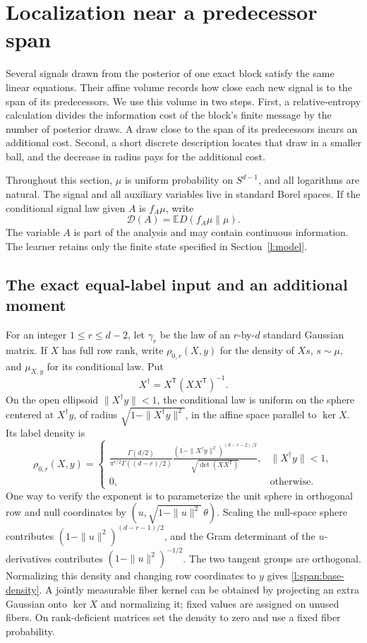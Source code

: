 \section{Localization near a predecessor span}
\label{l:span:section}

Several signals drawn from the posterior of one exact block satisfy
the same linear equations.  Their affine volume records how close
each new signal is to the span of its predecessors.  We use this
volume in two steps.  First, a relative-entropy calculation divides
the information cost of the block's finite message by the number of
posterior draws.  A draw close to the span of its predecessors incurs
an additional cost.  Second, a short discrete description locates
that draw in a smaller ball, and the decrease in radius pays for the
additional cost.

Throughout this section, \(\mu\) is uniform probability on
\(S^{d-1}\), and all logarithms are natural.  The signal and all
auxiliary variables live in standard Borel spaces.  If the conditional
signal law given \(A\) is \(f_A\mu\), write
\[
 \mathcal D(A)=\mathbb E D(f_A\mu\|\mu).
\]
The variable \(A\) is part of the analysis and may contain continuous
information.  The learner retains only the finite state specified in
Section~\ref{l:model}.

\subsection{The exact equal-label input and an additional moment}

For an integer \(1\le r\le d-2\), let \(\gamma_r\) be the law of an
\(r\)-by-\(d\) standard Gaussian matrix.  If \(X\) has full row rank,
write \(\rho_{0,r}(X,y)\) for the density of \(Xs\), \(s\sim\mu\), and
\(\mu_{X,y}\) for its conditional law.  Put
\[
 X^\dagger=X^{\mathsf T}(XX^{\mathsf T})^{-1}.
\]
On the open ellipsoid \(\|X^\dagger y\|<1\), the conditional law is
uniform on the sphere centered at \(X^\dagger y\), of radius
\(\sqrt{1-\|X^\dagger y\|^2}\), in the affine space parallel to
\(\ker X\).  Its label density is
\begin{equation}
 \rho_{0,r}(X,y)=
 \begin{cases}
 \displaystyle
 \frac{\Gamma(d/2)}{\pi^{r/2}\Gamma((d-r)/2)}
 \frac{(1-\|X^\dagger y\|^2)^{(d-r-2)/2}}
      {\sqrt{\det(XX^{\mathsf T})}},
 &\|X^\dagger y\|<1,\\
 0,&\text{otherwise}.
 \end{cases}
 \label{l:span:base-density}
\end{equation}
One way to verify the exponent is to parameterize the unit sphere in
orthogonal row and null coordinates by
\((u,\sqrt{1-\|u\|^2}\,\theta)\).  Scaling the null-space sphere
contributes \((1-\|u\|^2)^{(d-r-1)/2}\), and the Gram determinant of
the \(u\)-derivatives contributes \((1-\|u\|^2)^{-1/2}\).
The two tangent groups are orthogonal.  Normalizing this density and
changing row coordinates to \(y\) gives
\eqref{l:span:base-density}.  A jointly measurable fiber kernel can
be obtained by projecting an extra Gaussian onto \(\ker X\) and
normalizing it; fixed values are assigned on unused fibers.  On
rank-deficient matrices set the density to zero and use a fixed
fiber probability.

